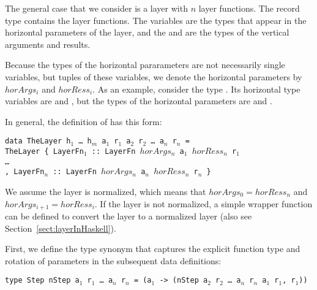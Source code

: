 \documentclass[preprint,natbib]{sigplanconf}
\begin{document}


The general case that we consider is a layer with $n$ layer functions. The record type  contains the layer functions. The  variables are the types that appear in the horizontal parameters of the layer, and the  and  are the types of the vertical arguments and results. 

Because the types of the horizontal pararameters are not necessarily single  variables, but tuples of these variables, we denote the horizontal parameters by $horArgs_i$ and $horRess_i$. As an example, consider the type . Its horizontal  type variables are  and , but the types of the horizontal parameters are  and . 

In general, the definition of  has this form:
\
\begin{small}
\begin{tabbing}
{\tt data Th}\={\tt eLayer h$_1$ \dots ~h$_m$ a$_1$ r$_1$ a$_2$ r$_2$ \dots ~a$_n$ r$_n$ = }\\
\> {\tt TheLayer~}\={\tt \{~LayerFn$_1$}\verb| :: |{\tt LayerFn $horArgs_n$ a$_1$ $horRess_n$ r$_1$}\\
\>\> {\tt \dots }\\
\>\> {\tt , LayerFn$_n$}\verb| :: |{\tt LayerFn $horArgs_n$ a$_n$ $horRess_n$ r$_n$ \}}\\
\end{tabbing}
\end{small}

We assume the layer is normalized, which means that $horArgs_{0} = horRess_n$ and 
$horArgs_{i+1} = horRess_i$. If the layer is not normalized, a simple wrapper function can be defined to convert the layer to a normalized layer (also see Section~\ref{sect:layerInHaskell}).

\head{Type definitions}

\bc
First, we define the \p{Step} type synonym that captures the explicit function type and rotation of parameters in the subsequent data definitions:

\begin{small}
\begin{tabbing}
{\tt type St}\={\tt ep nStep a$_1$ r$_1$ \dots~a$_n$ r$_n$ = (a$_1$ -> (nStep a$_2$ r$_2$ \dots~a$_n$ r$_n$ a$_1$ r$_1$, r$_1$))}
\end{tabbing}
\end{small}
\end{document}
